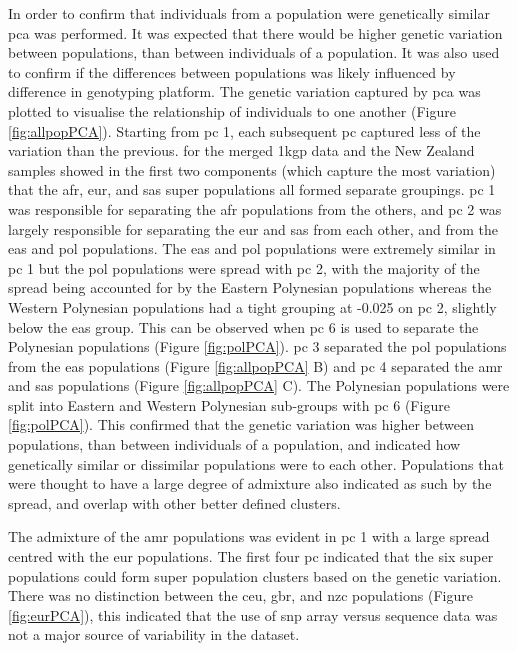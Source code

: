 \documentclass[twoside,openright]{report}
\begin{document}
In order to confirm that individuals from a population were genetically
similar \gls{pca} was performed. It was expected that there would be
higher genetic variation between populations, than between individuals
of a population. It was also used to confirm if the differences between
populations was likely influenced by difference in genotyping platform.
The genetic variation captured by \gls{pca} was plotted to visualise the
relationship of individuals to one another (Figure \ref{fig:allpopPCA}).
Starting from \gls{pc} 1, each subsequent \gls{pc} captured less of the
variation than the previous.  for the merged
\gls{1kgp} data and the New Zealand samples showed in the first two
components (which capture the most variation) that the \gls{afr},
\gls{eur}, and \gls{sas} super populations all formed separate
groupings. \Gls{pc} 1 was responsible for separating the \gls{afr}
populations from the others, and \gls{pc} 2 was largely responsible for
separating the \gls{eur} and \gls{sas} from each other, and from the
\gls{eas} and \gls{pol} populations. The \gls{eas} and \gls{pol}
populations were extremely similar in \gls{pc} 1 but the \gls{pol}
populations were spread with \gls{pc} 2, with the majority of the spread
being accounted for by the Eastern Polynesian populations whereas the
Western Polynesian populations had a tight grouping at -0.025 on
\gls{pc} 2, slightly below the \gls{eas} group. This can be observed
when \gls{pc} 6 is used to separate the Polynesian populations (Figure
\ref{fig:polPCA}). \Gls{pc} 3 separated the \gls{pol} populations from
the \gls{eas} populations (Figure \ref{fig:allpopPCA} B) and \gls{pc} 4
separated the \gls{amr} and \gls{sas} populations (Figure
\ref{fig:allpopPCA} C). The Polynesian populations were split into
Eastern and Western Polynesian sub-groups with \gls{pc} 6 (Figure
\ref{fig:polPCA}). This confirmed that the genetic variation was higher
between populations, than between individuals of a population, and
indicated how genetically similar or dissimilar populations were to each
other. Populations that were thought to have a large degree of admixture
also indicated as such by the spread, and overlap with other better
defined clusters.

The admixture of the \gls{amr} populations \citep{1KGP2015snp} was
evident in \gls{pc} 1 with a large spread centred with the \gls{eur}
populations. The first four \gls{pc} indicated that the six super
populations could form super population clusters based on the genetic
variation. There was no distinction between the \gls{ceu}, \gls{gbr},
and \gls{nzc} populations (Figure \ref{fig:eurPCA}), this indicated that
the use of \gls{snp} array versus sequence data was not a major source
of variability in the dataset.
\end{document}
